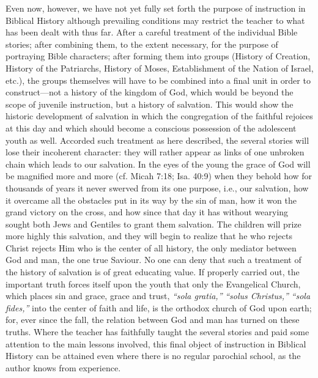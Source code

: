 Even now, however, we have not yet fully set forth the purpose of instruction in Biblical History although prevailing conditions may restrict the teacher to what has been dealt with thus far. After a careful treatment of the individual Bible stories; after combining them, to the extent necessary, for the purpose of portraying Bible characters; after forming them into groups (History of Creation, History of the Patriarchs, History of Moses, Establishment of the Nation of Israel, etc.), the groups themselves will have to be combined into a final unit in order to construct—not a history of the kingdom of God, which would be beyond the scope of juvenile instruction, but a history of salvation. This would show the historic development of salvation in which the congregation of the faithful rejoices at this day and which should become a conscious possession of the adolescent youth as well. Accorded such treatment as here described, the several stories will lose their incoherent character: they will rather appear as links of one unbroken chain which leads to our salvation. In the eyes of the young the grace of God will be magnified more and more (cf. Micah 7:18; Isa. 40:9) when they behold how for thousands of
years it never swerved from its one purpose, i.e., our salvation, how it overcame all the obstacles put in its way by the sin of man, how it won the grand victory on the cross, and how since that day it has without wearying sought both Jews and Gentiles to grant them salvation. The children will prize more highly this salvation, and they will begin to realize that he who rejects Christ rejects Him who is the center of all history, the only mediator between God and man, the one true Saviour. No one can deny that such a treatment of the history of salvation is of great educating value. If properly carried out, the important truth forces itself upon the youth that only the Evangelical Church, which places sin and grace, grace and trust, \emph{“sola gratia,”} \emph{“solus Christus,”} \emph{“sola fides,”} into the center of faith and life, is the orthodox church of God upon earth; for, ever since the fall, the relation between God and man has turned on these truths. Where the teacher has faithfully taught the several stories and paid some attention to the main lessons involved, this final object of instruction in Biblical History can be attained even where there is no regular parochial school, as the author knows from experience.

